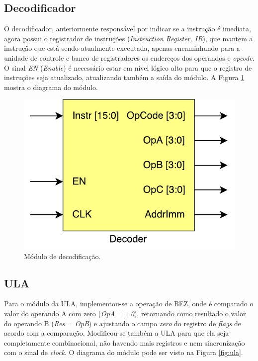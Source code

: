 \documentclass[11pt,a4paper,titlepage]{article}
\begin{document}
\subsection{Decodificador}\label{subsec:imp-decode}

O decodificador, anteriormente responsável por indicar se a instrução é imediata, agora possui o registrador de instruções (\textit{Instruction Register, IR}), que mantem a instrução que está sendo atualmente executada, apenas encaminhando para a unidade de controle e banco de registradores os endereços dos operandos e \textit{opcode}. O sinal \textit{EN} (\textit{Enable}) é necessário estar em nível lógico alto para que o registro de instruções seja atualizado, atualizando também a saída do módulo. A Figura \ref{fig:decoder} mostra o diagrama do módulo.

\begin{figure}[!h]
\centering
\includegraphics[scale=0.5]{images/Decoder.pdf}
\caption{Módulo de decodificação.}
\label{fig:decoder}
\end{figure}

\subsection{ULA}\label{subsec:imp-ula}

Para o módulo da ULA, implementou-se a operação de BEZ, onde é comparado o valor do operando A com zero (\textit{OpA == 0}), retornando como resultado o valor do operando B (\textit{Res = OpB}) e ajustando o campo \textit{zero} do registro de \textit{flags} de acordo com a comparação. Modificou-se também a ULA para que ela seja completamente combinacional, não havendo mais registros e nem sincronização com o sinal de \textit{clock}. O diagrama do módulo pode ser visto na Figura \ref{fig:ula}.
\end{document}
